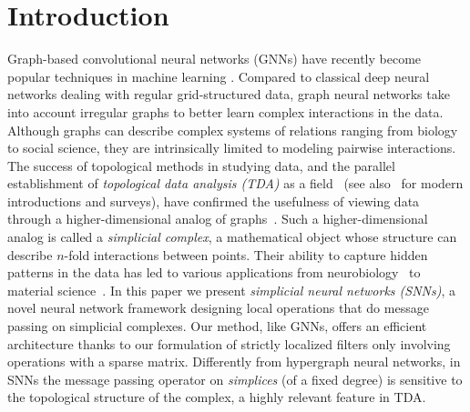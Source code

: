 \section{Introduction}



Graph-based convolutional neural networks (GNNs) have recently become popular techniques in machine learning . Compared to classical deep neural networks dealing with regular grid-structured data, graph neural networks take into account irregular graphs to better learn complex interactions in the data. Although graphs can describe complex systems of relations ranging from biology to social science, they are intrinsically limited to modeling pairwise interactions. 
The success of topological methods in studying data, and the parallel establishment of \emph{topological data analysis (TDA)} as a field~\cite{edelsbrunner2000topological, zomorodian2005computing} (see also~\cite{carlsson2008,chazal2017,edelsbrunner2010computational,ghrist2008barcodes} for modern introductions and surveys), have confirmed the usefulness of viewing data through a higher-dimensional analog of graphs~\cite{moore2012,patania2017}. Such a higher-dimensional analog is called a \emph{simplicial complex}, a mathematical object whose structure can  describe $n$-fold interactions between points. Their ability to capture hidden patterns in the data has led to various applications from neurobiology~\cite{giusti2015,reimann2017} to material science~\cite{hiraoka2016}.
In this paper we present \textit{simplicial neural networks (SNNs)}, a novel neural network framework designing local operations that do message passing on simplicial complexes.
Our method, like GNNs, offers an efficient architecture thanks to our formulation of strictly localized filters only involving operations with a sparse matrix. 
Differently from hypergraph neural networks, in SNNs the message passing operator on \emph{simplices} (of a fixed degree) is sensitive to the topological structure of the complex, a highly relevant feature in TDA.







 













